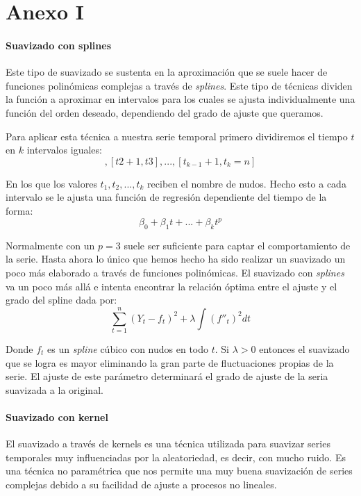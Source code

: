 \documentclass[12pt,a4paper,oneside]{article}
\begin{document}
\part*{Anexo I}

\subsection*{Suavizado con splines}
Este tipo de suavizado se sustenta en la aproximación que se suele hacer de funciones polinómicas complejas a través de \textit{splines}. Este tipo de técnicas dividen la función a aproximar en intervalos para los cuales se ajusta individualmente una función del orden deseado, dependiendo del grado de ajuste que queramos.

Para aplicar esta técnica a nuestra serie temporal primero dividiremos el tiempo $t$ en $k$ intervalos iguales:
\begin{equation}
   [t_{1} = 1, t_{2}],[t{2} + 1, t{3}],...,[t_{k-1}+1, t_{k} = n]
\end{equation}

En los que los valores $t_{1}, t_{2}, ..., t_{k}$ reciben el nombre de nudos. Hecho esto a cada intervalo se le ajusta una función de regresión dependiente del tiempo de la forma:
\begin{equation}
   \beta_{0} + \beta_{1}t + ... + \beta_{k}t^p
\end{equation}

Normalmente con un $p = 3$ suele ser suficiente para captar el comportamiento de la serie. Hasta ahora lo único que hemos hecho ha sido realizar un suavizado un poco más elaborado a través de funciones polinómicas. El suavizado con \textit{splines} va un poco más allá e intenta encontrar la relación óptima entre el ajuste y el grado del spline dada por:
\begin{equation}
   \sum_{t = 1}^{n} (Y_{t} - f_{t})^2 + \lambda \int(f''_{t})^2 dt
\end{equation}

Donde $f_{t}$ es un \textit{spline} cúbico con nudos en todo $t$. Si $\lambda > 0$ entonces el suavizado que se logra es mayor eliminando la gran parte de fluctuaciones propias de la serie. El ajuste de este parámetro determinará el grado de ajuste de la seria suavizada a la original.

\subsection*{Suavizado con kernel}
El suavizado a través de kernels es una técnica utilizada para suavizar series temporales muy influenciadas por la aleatoriedad, es decir, con mucho ruido. Es una técnica no paramétrica que nos permite una muy buena suavización de series complejas debido a su facilidad de ajuste a procesos no lineales.
\end{document}
